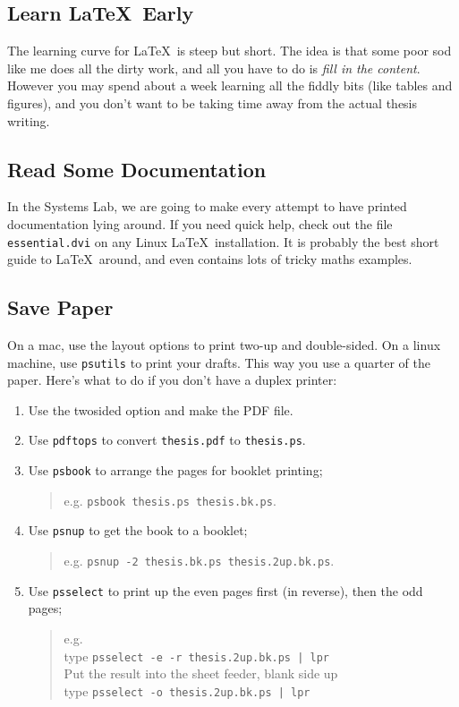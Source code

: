 \subsection{Learn \LaTeX\ Early}
The learning curve for \LaTeX\ is steep but short.  The idea is that
some poor sod like me does all the dirty work, and all you have to do
is {\em fill in the content}.  However you may spend about a week
learning all the fiddly bits (like tables and figures), and you don't
want to be taking time away from the actual thesis writing.

\subsection{Read Some Documentation}
In the Systems Lab, we are going to make every attempt to have
printed documentation lying around.  If you need quick help, check out
the file {\tt essential.dvi} on any Linux \LaTeX\ installation.  It
is probably the best short guide to \LaTeX\ around, and even contains
lots of tricky maths examples.

\subsection{Save Paper}
On a mac, use the layout options to print two-up and double-sided. On a
linux machine, use {\tt  psutils} to print your drafts.  This way you
use a quarter of the paper.  Here's what to do if you don't have
a duplex printer:
\begin{enumerate}
\item Use the twosided option and make the PDF file.
\item Use \verb|pdftops| to convert \verb|thesis.pdf| to \verb|thesis.ps|.
\item Use {\tt psbook} to arrange the pages for booklet printing;
\begin{quote}
e.g. {\tt psbook thesis.ps thesis.bk.ps}.
\end{quote}
\item Use {\tt psnup} to get the book to a booklet;
\begin{quote}
e.g. {\tt psnup -2 thesis.bk.ps thesis.2up.bk.ps}.
\end{quote}
\item Use {\tt psselect} to print up the even pages first (in reverse),
then the odd pages;
\begin{quote}
e.g.\\
type {\tt psselect -e -r thesis.2up.bk.ps | lpr}\\
Put the result into the sheet feeder, blank side up\\
type {\tt psselect -o thesis.2up.bk.ps | lpr}\\
\end{quote}
\end{enumerate}

